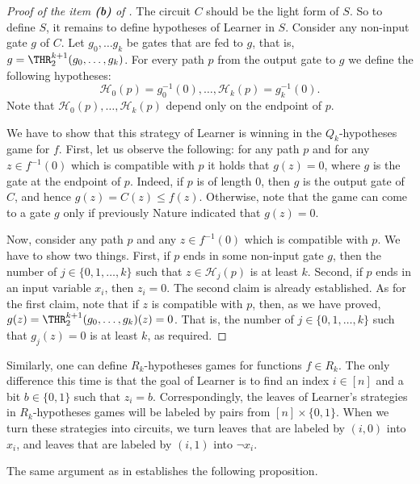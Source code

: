 \begin{proof}[Proof of the item \textbf{(b)} of ]
The circuit $C$ should be the light form of $S$. So to define $S$, it remains to define hypotheses of Learner in $S$. Consider any non-input gate $g$ of $C$. Let $g_0, \ldots g_k$ be gates that are fed to $g$, that is, $g = \THR^{k+1}_2(g_0, \ldots, g_k)$. For every path $p$ from the output gate to $g$ we define the following hypotheses:
\[
 \mathcal{H}_0(p) = g_0^{-1}(0), \ldots, \mathcal{H}_k(p) = g_k^{-1}(0).
\]
Note that $\mathcal{H}_0(p), \ldots, \mathcal{H}_k(p)$ depend only on the endpoint of $p$. 

We have to show that this strategy of Learner is winning in the $Q_k$-hypotheses game for $f$. First, let us observe the following: for any path $p$ and for any $z\in f^{-1}(0)$ which is compatible with $p$ it holds that $g(z) = 0$, where $g$ is the gate at the endpoint of $p$. Indeed, if $p$ is of length 0, then $g$ is the output gate of $C$, and hence $g(z) = C(z) \le f(z)$. Otherwise, note that the game can come to a gate $g$ only if previously Nature indicated that $g(z) = 0$.

Now, consider any path $p$ and any $z\in f^{-1}(0)$ which is compatible with $p$. We have to show two things. First, if $p$ ends in some non-input gate $g$, then the number of $j\in\{0, 1, \ldots, k\}$ such that $z\in \mathcal{H}_j(p)$ is at least $k$. Second, if $p$ ends in an input variable $x_i$, then $z_i = 0$. The second claim is already established. As for the first claim, note that if $z$ is compatible with $p$, then, as we have proved, $g(z) = \THR^{k+1}_2(g_0, \ldots, g_k)(z) = 0$. That is, the number of $j\in\{0, 1,\ldots,k\}$ such that $g_j(z) = 0$ is at least $k$, as required.
\end{proof}

Similarly, one can define $R_k$-hypotheses games for functions $f\in R_k$. The only difference this time is that the goal of Learner is to find an index $i\in[n]$ and a bit $b\in \{0,1\}$ such that $z_i = b$. Correspondingly,
%
the leaves %
of Learner's strategies in $R_k$-hypotheses games will be labeled by pairs from $[n]\times\{0,1\}$. When we turn these strategies into circuits, we
turn %
leaves  %
that are labeled by $(i, 0)$ into $x_i$, and %
leaves  %
that are labeled by $(i, 1)$ into $\lnot x_i$.

The same argument as in  establishes the following proposition.
 

